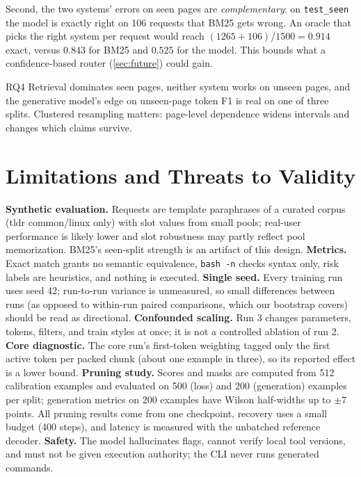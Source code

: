 \documentclass[11pt,a4paper]{article}
\begin{document}
Second, the two systems' errors on seen pages are \emph{complementary}: on
\texttt{test\_seen} the model is exactly right on 106 requests that BM25 gets
wrong. An oracle that picks the right system per request would reach
$(1265+106)/1500 = 0.914$ exact, versus $0.843$ for BM25 and $0.525$ for the
model. This bounds what a confidence-based router (\cref{sec:future}) could
gain.

\begin{finding}{RQ4}
Retrieval dominates seen pages, neither system works on unseen pages, and the
generative model's edge on unseen-page token F1 is real on one of three
splits. Clustered resampling matters: page-level dependence widens intervals
and changes which claims survive.
\end{finding}



\section{Limitations and Threats to Validity}
\label{sec:limitations}

\textbf{Synthetic evaluation.} Requests are template paraphrases of a curated
corpus (tldr common/linux only) with slot values from small pools;
real-user performance is likely lower and slot robustness may partly reflect
pool memorization. BM25's seen-split strength is an artifact of this design.
\textbf{Metrics.} Exact match grants no semantic equivalence,
\texttt{bash -n} checks syntax only, risk labels are heuristics, and nothing
is executed. \textbf{Single seed.} Every training run uses seed 42; run-to-run
variance is unmeasured, so small differences between runs (as opposed to
within-run paired comparisons, which our bootstrap covers) should be read as
directional. \textbf{Confounded scaling.} Run 3 changes parameters, tokens,
filters, and train styles at once; it is not a controlled ablation of run 2.
\textbf{Core diagnostic.} The core run's first-token weighting tagged only
the first active token per packed chunk (about one example in three), so its
reported effect is a lower bound. \textbf{Pruning study.} Scores and masks are
computed from 512 calibration examples and evaluated on 500 (loss) and 200
(generation) examples per split; generation metrics on 200 examples have
Wilson half-widths up to $\pm7$ points. All pruning results come from one
checkpoint, recovery uses a small budget (400 steps), and latency is measured
with the unbatched reference decoder. \textbf{Safety.} The model
hallucinates flags, cannot verify local tool versions, and must not be given
execution authority; the CLI never runs generated commands.
\end{document}

